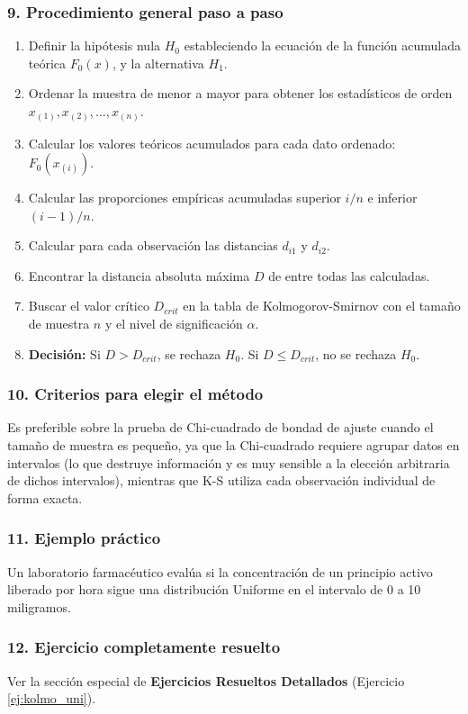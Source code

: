 \documentclass[11pt,a4paper]{article}
\begin{document}
\subsubsection{9. Procedimiento general paso a paso}
\begin{enumerate}
    \item Definir la hipótesis nula $H_0$ estableciendo la ecuación de la función acumulada teórica $F_0(x)$, y la alternativa $H_1$.
    \item Ordenar la muestra de menor a mayor para obtener los estadísticos de orden $x_{(1)}, x_{(2)}, \dots, x_{(n)}$.
    \item Calcular los valores teóricos acumulados para cada dato ordenado: $F_0(x_{(i)})$.
    \item Calcular las proporciones empíricas acumuladas superior $i/n$ e inferior $(i-1)/n$.
    \item Calcular para cada observación las distancias $d_{i1}$ y $d_{i2}$.
    \item Encontrar la distancia absoluta máxima $D$ de entre todas las calculadas.
    \item Buscar el valor crítico $D_{crit}$ en la tabla de Kolmogorov-Smirnov con el tamaño de muestra $n$ y el nivel de significación $\alpha$.
    \item \textbf{Decisión:} Si $D > D_{crit}$, se rechaza $H_0$. Si $D \le D_{crit}$, no se rechaza $H_0$.
\end{enumerate}

\subsubsection{10. Criterios para elegir el método}
Es preferible sobre la prueba de Chi-cuadrado de bondad de ajuste cuando el tamaño de muestra es pequeño, ya que la Chi-cuadrado requiere agrupar datos en intervalos (lo que destruye información y es muy sensible a la elección arbitraria de dichos intervalos), mientras que K-S utiliza cada observación individual de forma exacta.

\subsubsection{11. Ejemplo práctico}
Un laboratorio farmacéutico evalúa si la concentración de un principio activo liberado por hora sigue una distribución Uniforme en el intervalo de 0 a 10 miligramos.

\subsubsection{12. Ejercicio completamente resuelto}
Ver la sección especial de \textbf{Ejercicios Resueltos Detallados} (Ejercicio \ref{ej:kolmo_uni}).
\end{document}
